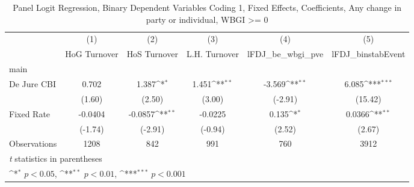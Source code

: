 \begin{table}[htbp]\centering
\def\sym#1{\ifmmode^{#1}\else\(^{#1}\)\fi}
\caption{Panel Logit Regression, Binary Dependent Variables Coding 1, Fixed Effects, Coefficients, Any change in party or individual, WBGI >= 0 \label{logitFEMultIndDJ}}
\begin{tabular}{l*{5}{c}}
\toprule
                                        &\multicolumn{1}{c}{(1)}&\multicolumn{1}{c}{(2)}&\multicolumn{1}{c}{(3)}&\multicolumn{1}{c}{(4)}&\multicolumn{1}{c}{(5)}\\
                                        &\multicolumn{1}{c}{HoG Turnover}&\multicolumn{1}{c}{HoS Turnover}&\multicolumn{1}{c}{L.H. Turnover}&\multicolumn{1}{c}{lFDJ\_be\_wbgi\_pve}&\multicolumn{1}{c}{lFDJ\_binstabEvent}\\
\midrule
main                                    &                  &                  &                  &                  &                  \\
De Jure CBI                             &    0.702         &    1.387\sym{*}  &    1.451\sym{**} &   -3.569\sym{**} &    6.085\sym{***}\\
                                        &   (1.60)         &   (2.50)         &   (3.00)         &  (-2.91)         &  (15.42)         \\
\addlinespace
Fixed Rate                              &  -0.0404         &  -0.0857\sym{**} &  -0.0225         &    0.135\sym{*}  &   0.0366\sym{**} \\
                                        &  (-1.74)         &  (-2.91)         &  (-0.94)         &   (2.52)         &   (2.67)         \\
\midrule
Observations                            &     1208         &      842         &      991         &      760         &     3912         \\
\bottomrule
\multicolumn{6}{l}{\footnotesize \textit{t} statistics in parentheses}\\
\multicolumn{6}{l}{\footnotesize \sym{*} \(p<0.05\), \sym{**} \(p<0.01\), \sym{***} \(p<0.001\)}\\
\end{tabular}
\end{table}
